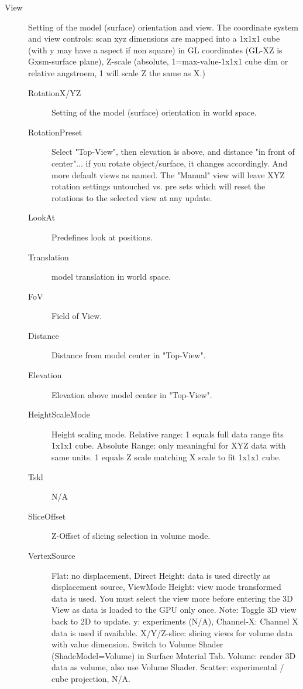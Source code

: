\begin{description}
	\item[View] Setting of the model (surface) orientation and view.
		The	coordinate system and view controls: scan xyz dimensions are mapped into a 1x1x1 cube (with y may have a aspect if non square) in GL coordinates (GL-XZ is Gxsm-surface plane), Z-scale (absolute, 1=max-value-1x1x1 cube dim or relative angstroem, 1 will scale Z the same as X.)
	
		\begin{description}
			\item[RotationX/YZ] Setting of the model (surface) orientation in world space.
			\item[RotationPreset] Select "Top-View", then elevation is above, and distance "in front of center"... if you rotate object/surface, it changes accordingly. And more default views as named. The "Manual" view will leave XYZ rotation settings untouched vs. pre sets which will reset the rotations to the selected view at any update. 
			\item[LookAt] Predefines look at positions.
			\item[Translation] model translation in world space.
			\item[FoV] Field of View.
			\item[Distance] Distance from model center in "Top-View".
			\item[Elevation] Elevation above model center in "Top-View".
			\item[HeightScaleMode] Height scaling mode. Relative range: 1 equals full data range fits 1x1x1 cube.
			Absolute Range: only meaningful for XYZ data with same units. 1 equals Z scale matching X scale to fit 1x1x1 cube.
			\item[Tskl] N/A
			\item[SliceOffset] Z-Offset of slicing selection in volume mode.
			\item[VertexSource] Flat: no displacement, Direct Height: data is used directly as displacement source,
			ViewMode Height: view mode transformed data is used. You must select the view more before entering the 3D View as data is loaded to the GPU only once. Note: Toggle 3D view back to 2D to update. y: experiments (N/A), Channel-X: Channel X data is used if available. X/Y/Z-slice: slicing views for volume data with value dimension. Switch to Volume Shader (ShadeModel=Volume) in Surface Material Tab. Volume: render 3D data as volume, also use Volume Shader. Scatter: experimental / cube projection, N/A.

\end{description}
\end{description}
